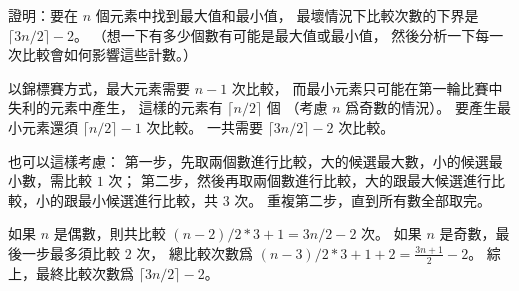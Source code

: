 
\startEXERCISE\DIFFICULT
證明：要在 $n$ 個元素中找到最大值和最小值，
最壞情況下比較次數的下界是 $\lceil 3n/2 \rceil - 2$。
（\hint 想一下有多少個數有可能是最大值或最小值，
然後分析一下每一次比較會如何影響這些計數。）
\stopEXERCISE

\startANSWER
以錦標賽方式，最大元素需要 $n-1$ 次比較，
而最小元素只可能在第一輪比賽中失利的元素中產生，
這樣的元素有 $\lceil n/2 \rceil$ 個
（考慮 $n$ 爲奇數的情況）。
要產生最小元素還須 $\lceil n/2 \rceil - 1$ 次比較。
一共需要 $\lceil 3n/2 \rceil - 2$ 次比較。

也可以這樣考慮：
第一步，先取兩個數進行比較，大的候選最大數，小的候選最小數，需比較 $1$ 次；
第二步，然後再取兩個數進行比較，大的跟最大候選進行比較，小的跟最小候選進行比較，共 $3$ 次。
重複第二步，直到所有數全部取完。

如果 $n$ 是偶數，則共比較 $ (n-2)/2 * 3 + 1 = 3n/2 - 2$ 次。
如果 $n$ 是奇數，最後一步最多須比較 $2$ 次，
總比較次數爲 $(n-3)/2*3 + 1 + 2 = \frac{3n+1}{2}-2$。
綜上，最終比較次數爲 $\lceil 3n/2 \rceil - 2$。

\stopANSWER
